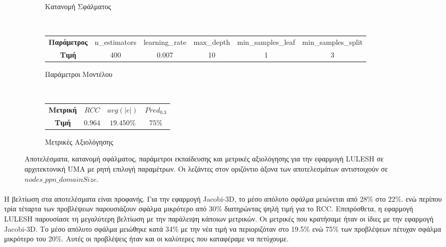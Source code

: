 \begin{figure}[H]
\begin{subfigure}[b]{0.47\textwidth}
        \caption{Κατανομή Σφάλματος}
    \end{subfigure} 
    \\[0.2cm]
    \begin{subfigure}[b]{\textwidth}
   	 	\scriptsize
		\begin{tabular}{c||c|c|c|c|c}
			\textbf{Παράμετρος} & n\_estimators & learning\_rate & max\_depth & min\_samples\_leaf & min\_samples\_split \\
			\textbf{Τιμή}       &       400        &  0.007               & 10          &  1                  &    3                 
		\end{tabular}
		\caption{Παράμετροι Μοντέλου}
    \end{subfigure}
    \\[0.2cm]
    \begin{subfigure}[b]{\textwidth}
    		\centering
   	 	\scriptsize
		\begin{tabular}{c||c|c|c}
			\textbf{Μετρική} & $RCC$ &   $avg(|e|)$ & $Pred_{0.3}$  \\
			\textbf{Τιμή}  &  $0.964$   &      $19.450\%
			$        &  $75\%$                                         
		\end{tabular}
		\caption{Μετρικές Αξιολόγησης}
    \end{subfigure}
    
        \caption{Αποτελέσματα, κατανομή σφάλματος, παράμετροι εκπαίδευσης και μετρικές αξιολόγησης για την εφαρμογή LULESH σε αρχιτεκτονική UMA με ρητή επιλογή παραμέτρων. Οι λεζάντες στον οριζόντιο άξονα των αποτελεσμάτων αντιστοιχούν σε $nodes\_ppn\_domainSize$.}
    \label{fig:NB+cg_avgonly_lulesh_UMA}
\end{figure}

\paragraph{}
Η βελτίωση στα αποτελέσματα είναι προφανής. Για την εφαρμογή Jacobi-3D, το μέσο απόλυτο σφάλμα μειώνεται από 28\% στο 22\%. ενώ περίπου τρία τέταρτα των προβλέψεων παρουσιάζουν σφάλμα μικρότερο από 30\% διατηρώντας ψηλή τιμή για το RCC. Επιπρόσθετα, η εφαρμογή LULESH παρουσίασε τη μεγαλύτερη βελτίωση με την παράλειψη κάποιων μετρικών. Οι μετρικές που κρατήσαμε ήταν οι ίδιες με την εφαρμογή Jacobi-3D. Το μέσο απόλυτο σφάλμα μειώθηκε κατά 34\% με την νέα τιμή να περιοριζόταν στο 19.5\%  ενώ 75\% των προβλέψεων πέτυχαν σφάλμα μικρότερο του 20\%. Αυτές οι προβλέψεις ήταν και οι καλύτερες που καταφέραμε να πετύχουμε.






